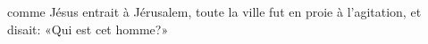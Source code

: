 \encetemps comme Jésus entrait à Jérusalem,
	toute la ville fut en proie à l’agitation, et disait:
	«Qui est cet homme?»
